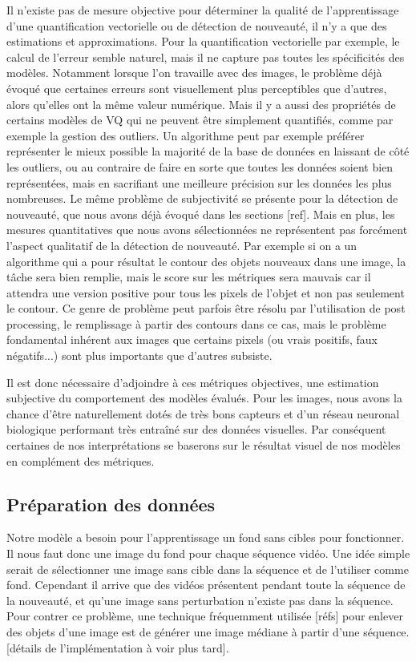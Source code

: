 	Il n'existe pas de mesure objective pour déterminer la qualité de l'apprentissage d'une quantification vectorielle ou de détection de nouveauté, il n'y a que des estimations et approximations. Pour la quantification vectorielle par exemple, le calcul de l'erreur semble naturel, mais il ne capture pas toutes les spécificités des modèles. Notamment lorsque l'on travaille avec des images, le problème déjà évoqué que certaines erreurs sont visuellement plus perceptibles que d'autres, alors qu'elles ont la même valeur numérique. Mais il y a aussi des propriétés de certains modèles de VQ qui ne peuvent être simplement quantifiés, comme par exemple la gestion des outliers. Un algorithme peut par exemple préférer représenter le mieux possible la majorité de la base de données en laissant de côté les outliers, ou au contraire de faire en sorte que toutes les données soient bien représentées, mais en sacrifiant une meilleure précision sur les données les plus nombreuses. Le même problème de subjectivité se présente pour la détection de nouveauté, que nous avons déjà évoqué dans les sections [ref]. Mais en plus, les mesures quantitatives que nous avons sélectionnées ne représentent pas forcément l'aspect qualitatif de la détection de nouveauté. Par exemple si on a un algorithme qui a pour résultat le contour des objets nouveaux dans une image, la tâche sera bien remplie, mais le score sur les métriques sera mauvais car il attendra une version positive pour tous les pixels de l'objet et non pas seulement le contour. Ce genre de problème peut parfois être résolu par l'utilisation de post processing, le remplissage à partir des contours dans ce cas, mais le problème fondamental inhérent aux images que certains pixels (ou vrais positifs, faux négatifs...) sont plus importants que d'autres subsiste.

	Il est donc nécessaire d'adjoindre à ces métriques objectives, une estimation subjective du comportement des modèles évalués. Pour les images, nous avons la chance d'être naturellement dotés de très bons capteurs et d'un réseau neuronal biologique performant très entraîné sur des données visuelles. Par conséquent certaines de nos interprétations se baserons sur le résultat visuel de nos modèles en complément des métriques.

	\subsection{Préparation des données}

	Notre modèle a besoin pour l'apprentissage un fond sans cibles pour fonctionner. Il nous faut donc une image du fond pour chaque séquence vidéo. Une idée simple serait de sélectionner une image sans cible dans la séquence et de l'utiliser comme fond. Cependant il arrive que des vidéos présentent pendant toute la séquence de la nouveauté, et qu'une image sans perturbation n'existe pas dans la séquence. Pour contrer ce problème, une technique fréquemment utilisée [réfs] pour enlever des objets d'une image est de générer une image médiane à partir d'une séquence. [détails de l'implémentation à voir plus tard].

